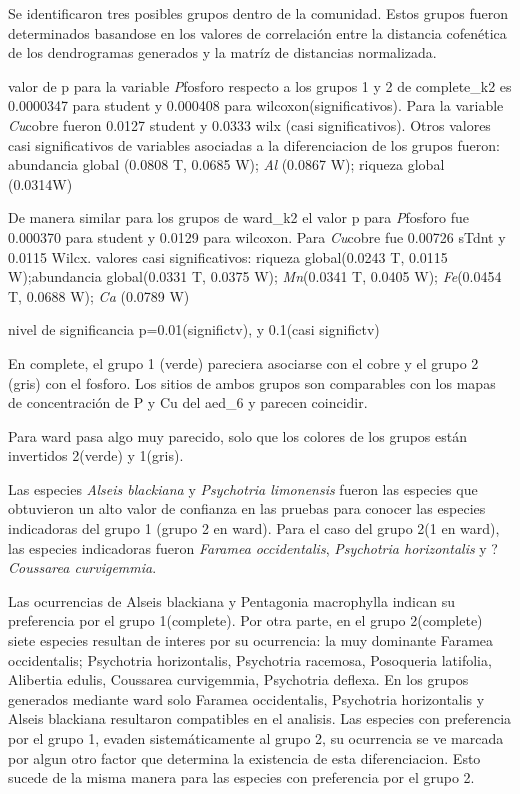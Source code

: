 \documentclass[11pt,]{article}
\begin{document}
Se identificaron tres posibles grupos dentro de la comunidad. Estos
grupos fueron determinados basandose en los valores de correlación entre
la distancia cofenética de los dendrogramas generados y la matríz de
distancias normalizada.

valor de p para la variable \emph{P}fosforo respecto a los grupos 1 y 2
de complete\_k2 es 0.0000347 para student y 0.000408 para
wilcoxon(significativos). Para la variable \emph{Cu}cobre fueron 0.0127
student y 0.0333 wilx (casi significativos). Otros valores casi
significativos de variables asociadas a la diferenciacion de los grupos
fueron: abundancia global (0.0808 T, 0.0685 W); \emph{Al} (0.0867 W);
riqueza global (0.0314W)

De manera similar para los grupos de ward\_k2 el valor p para
\emph{P}fosforo fue 0.000370 para student y 0.0129 para wilcoxon. Para
\emph{Cu}cobre fue 0.00726 sTdnt y 0.0115 Wilcx. valores casi
significativos: riqueza global(0.0243 T, 0.0115 W);abundancia
global(0.0331 T, 0.0375 W); \emph{Mn}(0.0341 T, 0.0405 W);
\emph{Fe}(0.0454 T, 0.0688 W); \emph{Ca} (0.0789 W)

nivel de significancia p=0.01(significtv), y 0.1(casi significtv)

En complete, el grupo 1 (verde) pareciera asociarse con el cobre y el
grupo 2 (gris) con el fosforo. Los sitios de ambos grupos son
comparables con los mapas de concentración de P y Cu del aed\_6 y
parecen coincidir.

Para ward pasa algo muy parecido, solo que los colores de los grupos
están invertidos 2(verde) y 1(gris).

Las especies \emph{Alseis blackiana} y \emph{Psychotria limonensis}
fueron las especies que obtuvieron un alto valor de confianza en las
pruebas para conocer las especies indicadoras del grupo 1 (grupo 2 en
ward). Para el caso del grupo 2(1 en ward), las especies indicadoras
fueron \emph{Faramea occidentalis}, \emph{Psychotria horizontalis} y
?\emph{Coussarea curvigemmia}.

Las ocurrencias de Alseis blackiana y Pentagonia macrophylla indican su
preferencia por el grupo 1(complete). Por otra parte, en el grupo
2(complete) siete especies resultan de interes por su ocurrencia: la muy
dominante Faramea occidentalis; Psychotria horizontalis, Psychotria
racemosa, Posoqueria latifolia, Alibertia edulis, Coussarea curvigemmia,
Psychotria deflexa. En los grupos generados mediante ward solo Faramea
occidentalis, Psychotria horizontalis y Alseis blackiana resultaron
compatibles en el analisis. Las especies con preferencia por el grupo 1,
evaden sistemáticamente al grupo 2, su ocurrencia se ve marcada por
algun otro factor que determina la existencia de esta diferenciacion.
Esto sucede de la misma manera para las especies con preferencia por el
grupo 2.
\end{document}
